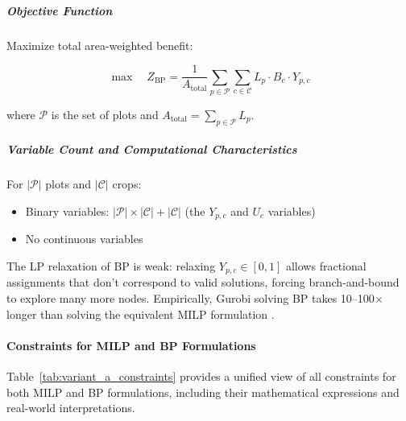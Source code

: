 \documentclass{oqireport}
\begin{document}
\subparagraph{Objective Function}

Maximize total area-weighted benefit:

\begin{equation}
\max \quad Z_{\text{BP}} = \frac{1}{A_{\text{total}}} \sum_{p \in \mathcal{P}} \sum_{c \in \mathcal{C}} L_p \cdot B_c \cdot Y_{p,c}
\label{eq:bp_objective}
\end{equation}

where $\mathcal{P}$ is the set of plots and $A_{\text{total}} = \sum_{p \in \mathcal{P}} L_p$.

\subparagraph{Variable Count and Computational Characteristics}

For $|\mathcal{P}|$ plots and $|\mathcal{C}|$ crops:
\begin{itemize}
    \item Binary variables: $|\mathcal{P}| \times |\mathcal{C}| + |\mathcal{C}|$ (the $Y_{p,c}$ and $U_c$ variables)
    \item No continuous variables
\end{itemize}


The LP relaxation of BP is weak: relaxing $Y_{p,c} \in [0,1]$ allows fractional assignments that don't correspond to valid solutions, forcing branch-and-bound to explore many more nodes. Empirically, Gurobi solving BP takes 10--100$\times$ longer than solving the equivalent MILP formulation \cite{wolsey1998integer}.

\paragraph{Constraints for MILP and BP Formulations}

Table~\ref{tab:variant_a_constraints} provides a unified view of all constraints for both MILP and BP formulations, including their mathematical expressions and real-world interpretations.
\end{document}
